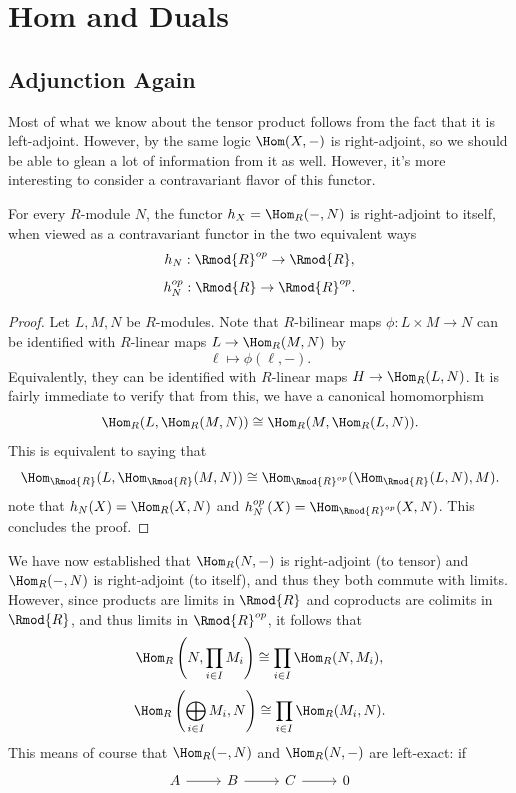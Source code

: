 \section{Hom and Duals}
\subsection{Adjunction Again}
Most of what we know about the tensor product follows from the fact that it is left-adjoint. However, by the same logic $\Hom(X, -) $ is right-adjoint, so we should be able to glean a lot of information from it as well. However, it's more interesting to consider a contravariant flavor of this functor.
\begin{proposition}\label{prp:8.5}
	For every $R$-module $N$, the functor $h_X=\Hom_{R}(-, N) $ is right-adjoint to itself, when viewed as a contravariant functor in the two equivalent ways
	\[
		h_N : \Rmod{R} ^{op}  \to \Rmod{R} 
	,\]
	\[
		h_N^{op}  : \Rmod{R}  \to \Rmod{R} ^{op} 
	.\]
\end{proposition}
\begin{proof}
	Let $L,M,N$ be $R$-modules. Note that $R$-bilinear maps $\phi : L\times M \to N$ can be identified with $R$-linear maps $L\to \Hom_{R}(M, N) $ by
	\[
		\ell \mapsto \phi (\ell ,-)
	.\]
	Equivalently, they can be identified with $R$-linear maps $H\to \Hom_{R}(L, N) $. It is fairly immediate to verify that from this, we have a canonical homomorphism
	\[
		\Hom_{R}(L, \Hom_{R}(M, N) ) \cong \Hom_{R}(M, \Hom_{R}(L, N) ) 
	.\]
	This is equivalent to saying that
	\[
		\Hom_{\Rmod{R} }(L, \Hom_{\Rmod{R} }(M, N) ) \cong \Hom_{\Rmod{R} ^{op} }(\Hom_{\Rmod{R} }(L, N) , M) 
	.\]
	note that $h_N(X)=\Hom_{R}(X, N) $ and $h_N^{op} \left(X \right) =\Hom_{\Rmod{R} ^{op} }(X, N) $. This concludes the proof.
\end{proof}
We have now established that $\Hom_{R}(N, -) $ is right-adjoint (to tensor) and $\Hom_{R}(-, N) $ is right-adjoint (to itself), and thus they both commute with limits. However, since products are limits in $\Rmod{R} $ and coproducts are colimits in $\Rmod{R}$, and thus limits in $\Rmod{R} ^{op} $, it follows that
\[
	\Hom_{R}\left( N,\prod_{i\in I} M_i \right) \cong \prod_{i\in I} \Hom_{R}(N, M_i) ,
\]
\[
	\Hom_{R}\left( \bigoplus_{i\in I}M_i,N \right) \cong \prod_{i\in I} \Hom_{R}(M_i,N) 
.\]
This means of course that $\Hom_{R}(-, N) $ and $\Hom_{R}(N, -) $ are left-exact: if
\[\begin{tikzcd}[row sep = 2.5em, column sep = 2.5em]
	A\arrow[r]&B\arrow[r]&C\arrow[r]&0
\end{tikzcd}\]
